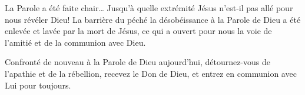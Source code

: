 \Og La Parole a été faite chair… \Fg{} Jusqu'à quelle extrémité Jésus n'est-il pas allé pour nous révéler Dieu! La barrière du péché \ocadr la désobéissance à la Parole de Dieu \fcadr{} a été enlevée et lavée par la mort de Jésus, ce qui a ouvert pour nous la voie de l'amitié et de la communion avec Dieu.

Confronté de nouveau à la Parole de Dieu aujourd'hui, détournez-vous de l'apathie et de la rébellion, recevez le Don de Dieu, et entrez en communion avec Lui pour toujours.

\begin{dvquotes}
\end{dvquotes}


